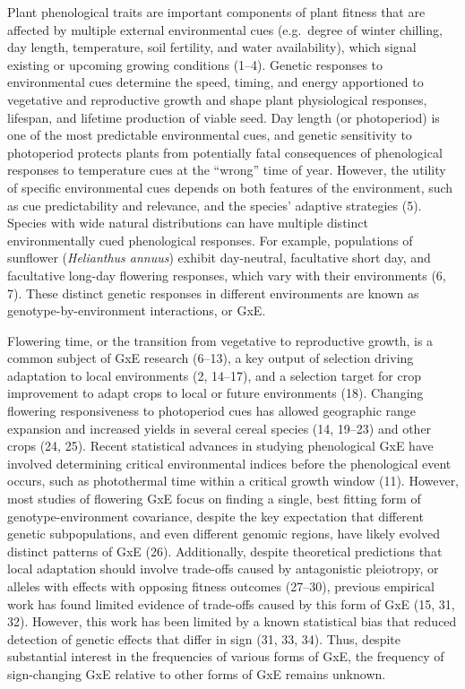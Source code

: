 \documentclass[
  9pt,
  twocolumn,
  twoside]{pnas-new}
\begin{document}
Plant phenological traits are important components of plant fitness that
are affected by multiple external environmental cues (e.g.~degree of
winter chilling, day length, temperature, soil fertility, and water
availability), which signal existing or upcoming growing conditions
(1--4). Genetic responses to environmental cues determine the speed,
timing, and energy apportioned to vegetative and reproductive growth and
shape plant physiological responses, lifespan, and lifetime production
of viable seed. Day length (or photoperiod) is one of the most
predictable environmental cues, and genetic sensitivity to photoperiod
protects plants from potentially fatal consequences of phenological
responses to temperature cues at the ``wrong'' time of year. However,
the utility of specific environmental cues depends on both features of
the environment, such as cue predictability and relevance, and the
species' adaptive strategies (5). Species with wide natural
distributions can have multiple distinct environmentally cued
phenological responses. For example, populations of sunflower
(\emph{Helianthus annuus}) exhibit day-neutral, facultative short day,
and facultative long-day flowering responses, which vary with their
environments (6, 7). These distinct genetic responses in different
environments are known as genotype-by-environment interactions, or GxE.

Flowering time, or the transition from vegetative to reproductive
growth, is a common subject of GxE research (6--13), a key output of
selection driving adaptation to local environments (2, 14--17), and a
selection target for crop improvement to adapt crops to local or future
environments (18). Changing flowering responsiveness to photoperiod cues
has allowed geographic range expansion and increased yields in several
cereal species (14, 19--23) and other crops (24, 25). Recent statistical
advances in studying phenological GxE have involved determining critical
environmental indices before the phenological event occurs, such as
photothermal time within a critical growth window (11). However, most
studies of flowering GxE focus on finding a single, best fitting form of
genotype-environment covariance, despite the key expectation that
different genetic subpopulations, and even different genomic regions,
have likely evolved distinct patterns of GxE (26). Additionally, despite
theoretical predictions that local adaptation should involve trade-offs
caused by antagonistic pleiotropy, or alleles with effects with opposing
fitness outcomes (27--30), previous empirical work has found limited
evidence of trade-offs caused by this form of GxE (15, 31, 32). However,
this work has been limited by a known statistical bias that reduced
detection of genetic effects that differ in sign (31, 33, 34). Thus,
despite substantial interest in the frequencies of various forms of GxE,
the frequency of sign-changing GxE relative to other forms of GxE
remains unknown.
\end{document}
